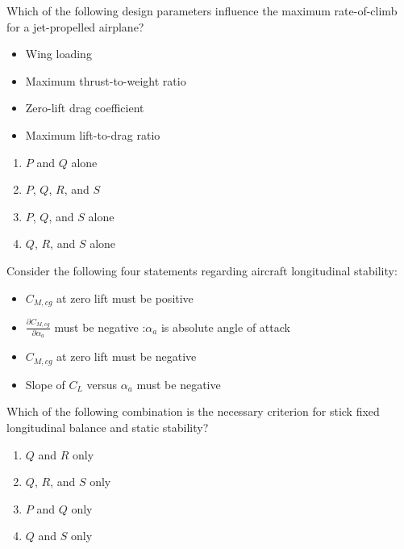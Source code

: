
\iffalse
    \title{Assignment}
    \author{EE24BTECH11034}
    \section{ae}
    \chapter{2014}
  \fi


\item Which of the following design parameters influence the maximum rate-of-climb for a jet-propelled airplane?

\begin{itemize}
    \item Wing loading
    \item Maximum thrust-to-weight ratio
    \item Zero-lift drag coefficient
    \item Maximum lift-to-drag ratio
\end{itemize}

\begin{enumerate}
    \item $P$ and $Q$ alone
    \item $P$, $Q$, $R$, and $S$
    \item $P$, $Q$, and $S$ alone
    \item $Q$, $R$, and $S$ alone
\end{enumerate}

\item Consider the following four statements regarding aircraft longitudinal stability:

\begin{itemize}
    \item $C_{M,cg}$ at zero lift must be positive
    \item $\frac{\partial C_{M,cg}}{\partial \alpha_a}$ must be negative :$\alpha_a$ is absolute angle of attack
    \item $C_{M,cg}$ at zero lift must be negative
    \item Slope of $C_L$ versus $\alpha_a$ must be negative
\end{itemize}

Which of the following combination is the necessary criterion for stick fixed longitudinal balance and static stability?


\begin{enumerate}
    \item $Q$ and $R$ only
    \item $Q$, $R$, and $S$ only
    \item $P$ and $Q$ only
    \item $Q$ and $S$ only
\end{enumerate}

